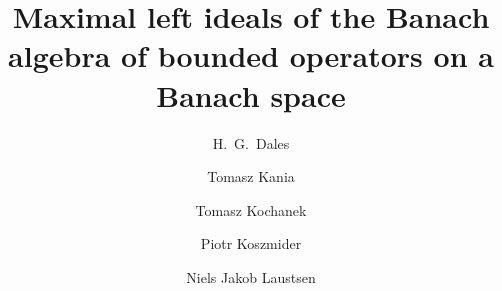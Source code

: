 \documentclass[12pt]{amsart}
\theoremstyle{definition}
\numberwithin{equation}{section}
\begin{document}
\title[Maximal left ideals of operators on a Banach space]{Maximal
  left ideals of the Banach algebra of bounded operators on a Banach
  space}
\author{H.~G.~Dales}
\address{Department of Mathematics and
  Statistics, Fylde College\\
  Lancaster University,
  Lancaster LA1 4YF, UK}
\author[T.~Kania]{Tomasz Kania}
\address{Department of Mathematics and
  Statistics, Fylde College\\
  Lancaster University,
  Lancaster LA1 4YF, UK}
\author[T.~Kochanek]{Tomasz Kochanek}
\address{Institute of Mathematics, University of Silesia\\
  ul.\ Bankowa 14, 40-007 Katowice, Poland} 
\author[P.~Koszmider]{Piotr Koszmider}
\address{Institute of Mathematics, Polish Academy of Sciences\\ 
ul.\ \'{S}niadeckich~8, 00-956 Warszawa, Poland}
\author[N.~J.~Laustsen]{Niels Jakob Laustsen}
\address{Department of Mathematics and
  Statistics, Fylde College\\
  Lancaster University,
  Lancaster LA1 4YF, UK} 
\date{}
\end{document}
